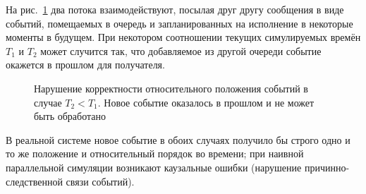 
На рис.~\ref{fig:two-queues-2} два потока взаимодействуют, посылая друг другу сообщения в виде событий, помещаемых в очередь и запланированных на исполнение в некоторые моменты в будущем. При некотором соотношении текущих симулируемых времён $T_1$ и $T_2$ может случится так, что добавляемое из другой очереди событие окажется в прошлом для получателя.

\begin{figure}[htbp]
    \centering
    \caption[Нарушение корректности относительного положения событий]{Нарушение корректности относительного положения событий в случае $T_2 < T_1$. Новое событие оказалось в прошлом и не может быть обработано}
    \label{fig:two-queues-2}
\end{figure}

В реальной системе новое событие в обоих случаях получило бы строго одно и то же положение и относительный порядок во времени; при наивной параллельной симуляции возникают каузальные ошибки (нарушение причинно-следственной связи событий).

